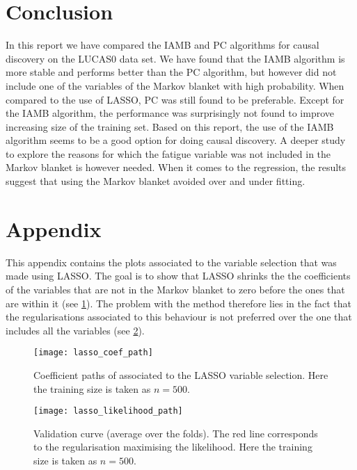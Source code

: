 \documentclass[a4paper, 12pt,oneside]{article}
\begin{document}
    \section{Conclusion}
    In this report we have compared the IAMB and PC algorithms for causal discovery on the LUCAS0 data set. We have found that the IAMB algorithm is more stable and performs better than the PC algorithm, but however did not include one of the variables of the Markov blanket with high probability. When compared to the use of LASSO, PC was still found to be preferable. Except for the IAMB algorithm, the performance was surprisingly not found to improve increasing size of the training set. Based on this report, the use of the IAMB algorithm seems to be a good option for doing causal discovery. A deeper study to explore the reasons for which the fatigue variable was not included in the Markov blanket is however needed. When it comes to the regression, the results suggest that using the Markov blanket avoided over and under fitting. %
    \section*{Appendix}
    This appendix contains the plots associated to the variable selection that was made using LASSO. The goal is to show that LASSO shrinks the the coefficients of the variables that are not in the Markov blanket to zero before the ones that are within it (see \ref{fig:lasso-coef-path}). The problem with the method therefore lies in the fact that the regularisations associated to this behaviour is not preferred over the one that includes all the variables (see \ref{fig:lasso-likelihood-path}).
    \begin{figure}[h!]
        \centering
        \vspace{0em}
        \texttt{[image: lasso\_coef\_path]}
        \caption{Coefficient paths of associated to the LASSO variable selection. Here the training size is taken as $n=500$.}
        \label{fig:lasso-coef-path}
    \end{figure}
    \begin{figure}[h!]
        \centering
        \vspace{0em}
        \texttt{[image: lasso\_likelihood\_path]}
        \caption{Validation curve (average over the folds). The red line corresponds to the regularisation maximising the likelihood. Here the training size is taken as $n=500$.}
        \label{fig:lasso-likelihood-path}
    \end{figure}
\end{document}

